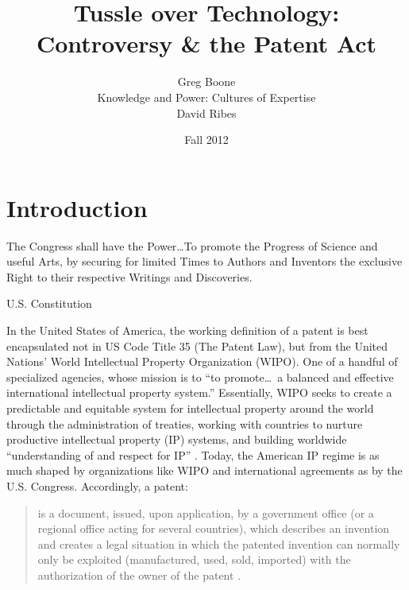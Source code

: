 \documentclass[pdftex,11pt,letterpaper]{article}
\title{Tussle over Technology: Controversy \& the Patent Act}
\author{Greg Boone \\ Knowledge and Power: Cultures of Expertise \\ David Ribes}
\date{Fall 2012}
\begin{document}
\maketitle


\section{Introduction}

\epigraph{The Congress shall have the Power\ldots To promote the Progress of Science and useful Arts, by securing for limited Times to Authors and Inventors the exclusive Right to their respective Writings and Discoveries.}{U.S. Constitution}

In the United States of America, the working definition of a patent is best encapsulated not in US Code Title 35 (The Patent Law), but from the United Nations' World Intellectual Property Organization (WIPO). One of a handful of specialized agencies, whose mission is to ``to promote\ldots~a balanced and effective international intellectual property system.'' Essentially, WIPO seeks to create a predictable and equitable system for intellectual property around the world through the administration of treaties, working with countries to nurture productive intellectual property (IP) systems, and building worldwide ``understanding of and respect for IP'' \autocite{WIPO2012}. Today, the American IP regime is as much shaped by organizations like WIPO and international agreements as by the U.S. Congress. Accordingly, a patent:

\begin{quote}is a document, issued, upon application, by a government office (or a regional office acting for several countries), which describes an invention and creates a legal situation in which the patented invention can normally only be exploited (manufactured, used, sold, imported) with the authorization of the owner of the patent \autocite{WIPO}.
\end{quote}
\end{document}
